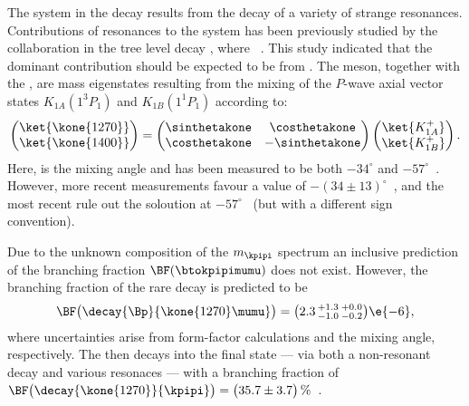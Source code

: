 The \kpipi system in the decay \btokpipimumu results from the decay of a variety of strange
resonances.
Contributions of resonances to the \kpipi system has been previously studied by the \belle
collaboration in the tree level decay \btojpsikpipi, where \jpsitomumu~\cite{Guler:2010if}.
This study indicated that the dominant contribution should be expected
to be from .
The  meson, together with the , are mass eigenstates resulting from the
mixing of the $P$-wave axial vector states $K_{1A}(1^3P_1)$ and $K_{1B}(1^1P_1)$ according to:
\begin{equation}
  \begin{pmatrix}
    \ket{\kone{1270}} \\
    \ket{\kone{1400}}
  \end{pmatrix}
  =
  \begin{pmatrix}
    \sinthetakone & \costhetakone \\
    \costhetakone & -\sinthetakone
  \end{pmatrix}
  \begin{pmatrix}
    \ket{K_{1A}^+} \\
    \ket{K_{1B}^+}
  \end{pmatrix}.
  \label{eq:k1mixing}
\end{equation}
Here, \thetakone is the mixing angle and has been measured to be both $-34^\circ$ and
$-57^\circ$~\cite{PhysRevD.47.1252,Tayduganov:2011ui,Hatanaka:2008xj,Cheng:2011pb,Divotgey:2013jba,Cheng:2013cwa}.
However, more recent measurements favour a value of
$-(34\pm13)^\circ$~\cite{Hatanaka:2008xj,Cheng:2011pb,Divotgey:2013jba,Cheng:2013cwa},
and the most recent rule out the soloution at $-57^\circ$~\cite{Divotgey:2013jba,Cheng:2013cwa}
(but with a different sign convention).



Due to the unknown composition of the $m_\kpipi$ spectrum an inclusive prediction of the branching
fraction $\BF(\btokpipimumu)$ does not exist.
However, the branching fraction of the rare decay  is predicted to
be~\cite{Hatanaka:2008gu}
\begin{equation}
  \BF\big(\decay{\Bp}{\kone{1270}\mumu}\big) = \big(2.3\,^{+1.3}_{-1.0}\,^{+0.0}_{-0.2}\big)\e{-6},
\end{equation}
where uncertainties arise from form-factor calculations and the mixing angle, respectively.
The  then decays into the \kpipi final state
--- via both a non-resonant decay and various resonaces ---
with a branching fraction of
$\BF\big(\decay{\kone{1270}}{\kpipi}\big)=\big(35.7\pm3.7\big)\,\%$~\cite{PDG2012}.

